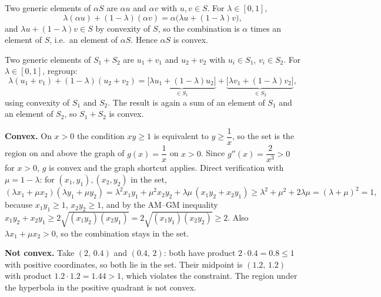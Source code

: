 \begin{solutions}
  \item Two generic elements of $\alpha S$ are $\alpha u$ and $\alpha v$
        with $u,v\in S$. For $\lambda\in[0,1]$,
        \[
          \lambda(\alpha u)+(1-\lambda)(\alpha v)
          =\alpha\bigl(\lambda u+(1-\lambda)v\bigr),
        \]
        and $\lambda u+(1-\lambda)v\in S$ by convexity of $S$, so the
        combination is $\alpha$ times an element of $S$, i.e.\ an element
        of $\alpha S$. Hence $\alpha S$ is convex.

  \item Two generic elements of $S_{1}+S_{2}$ are $u_{1}+v_{1}$ and
        $u_{2}+v_{2}$ with $u_{i}\in S_{1}$, $v_{i}\in S_{2}$. For
        $\lambda\in[0,1]$, regroup:
        \[
          \lambda(u_{1}+v_{1})+(1-\lambda)(u_{2}+v_{2})
          =\underbrace{\bigl[\lambda u_{1}+(1-\lambda)u_{2}\bigr]}_{\in
          S_{1}}
          +\underbrace{\bigl[\lambda v_{1}+(1-\lambda)v_{2}\bigr]}_{\in
          S_{2}} ,
        \]
        using convexity of $S_{1}$ and $S_{2}$. The result is again a sum
        of an element of $S_{1}$ and an element of $S_{2}$, so
        $S_{1}+S_{2}$ is convex.

  \item \textbf{Convex.} On $x>0$ the condition $xy\ge 1$ is equivalent to
        $y\ge \dfrac{1}{x}$, so the set is the region on and above the
        graph of $g(x)=\dfrac{1}{x}$ on $x>0$. Since
        $g''(x)=\dfrac{2}{x^{3}}>0$ for $x>0$, $g$ is convex and the graph
        shortcut applies. Direct verification with $\mu=1-\lambda$: for
        $(x_{1},y_{1}),(x_{2},y_{2})$ in the set,
        \[
          (\lambda x_{1}+\mu x_{2})(\lambda y_{1}+\mu y_{2})
          =\lambda^{2}x_{1}y_{1}+\mu^{2}x_{2}y_{2}
          +\lambda\mu\,(x_{1}y_{2}+x_{2}y_{1})
          \ge \lambda^{2}+\mu^{2}+2\lambda\mu=(\lambda+\mu)^{2}=1 ,
        \]
        because $x_{1}y_{1}\ge 1$, $x_{2}y_{2}\ge 1$, and by the
        AM--GM inequality
        $x_{1}y_{2}+x_{2}y_{1}\ge
        2\sqrt{(x_{1}y_{2})(x_{2}y_{1})}
        =2\sqrt{(x_{1}y_{1})(x_{2}y_{2})}\ge 2$. Also $\lambda
        x_{1}+\mu x_{2}>0$, so the combination stays in the set.

  \item \textbf{Not convex.} Take $(2,\,0.4)$ and $(0.4,\,2)$: both have
        product $2\cdot 0.4=0.8\le 1$ with positive coordinates, so both
        lie in the set. Their midpoint is $(1.2,\,1.2)$ with product
        $1.2\cdot 1.2=1.44>1$, which violates the constraint. The region
        under the hyperbola in the positive quadrant is not convex.
\end{solutions}

